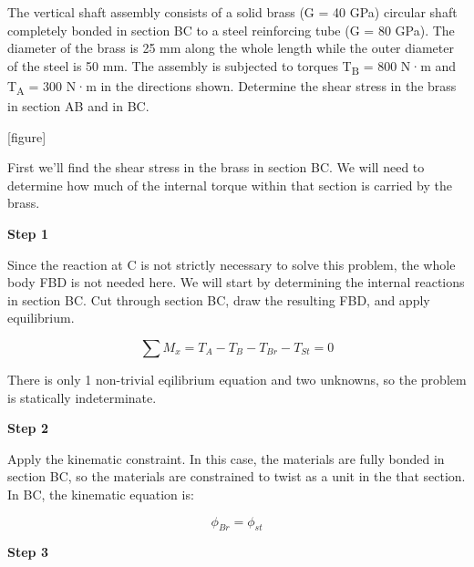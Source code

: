 \documentclass[
  letterpaper,
  DIV=11,
  numbers=noendperiod]{scrreprt}
\theoremstyle{definition}
\theoremstyle{remark}
\begin{document}
\begin{tcolorbox}[enhanced jigsaw, leftrule=.75mm, colbacktitle=quarto-callout-tip-color!10!white, breakable, opacityback=0, colback=white, titlerule=0mm, toprule=.15mm, colframe=quarto-callout-tip-color-frame, coltitle=black, title={Example 6.6}, toptitle=1mm, bottomrule=.15mm, rightrule=.15mm, left=2mm, arc=.35mm, opacitybacktitle=0.6, bottomtitle=1mm]

The vertical shaft assembly consists of a solid brass (G = 40 GPa)
circular shaft completely bonded in section BC to a steel reinforcing
tube (G = 80 GPa). The diameter of the brass is 25 mm along the whole
length while the outer diameter of the steel is 50 mm. The assembly is
subjected to torques T\textsubscript{B} = 800 N·m and T\textsubscript{A}
= 300 N·m in the directions shown. Determine the shear stress in the
brass in section AB and in BC.

{[}figure{]}

\begin{tcolorbox}[enhanced jigsaw, leftrule=.75mm, colbacktitle=quarto-callout-tip-color!10!white, breakable, opacityback=0, colback=white, titlerule=0mm, toprule=.15mm, colframe=quarto-callout-tip-color-frame, coltitle=black, title={Solution}, toptitle=1mm, bottomrule=.15mm, rightrule=.15mm, left=2mm, arc=.35mm, opacitybacktitle=0.6, bottomtitle=1mm]

First we'll find the shear stress in the brass in section BC. We will
need to determine how much of the internal torque within that section is
carried by the brass.

\textbf{Step 1}

Since the reaction at C is not strictly necessary to solve this problem,
the whole body FBD is not needed here. We will start by determining the
internal reactions in section BC. Cut through section BC, draw the
resulting FBD, and apply equilibrium.

\[
\sum M_x=T_A-T_B-T_{Br}-T_{St}=0
\]

There is only 1 non-trivial eqilibrium equation and two unknowns, so the
problem is statically indeterminate.

\textbf{Step 2}

Apply the kinematic constraint. In this case, the materials are fully
bonded in section BC, so the materials are constrained to twist as a
unit in the that section. In BC, the kinematic equation is:

\[
\phi_{B r}=\phi_{s t}
\]

\textbf{Step 3}


\end{tcolorbox}
\end{tcolorbox}
\end{document}
